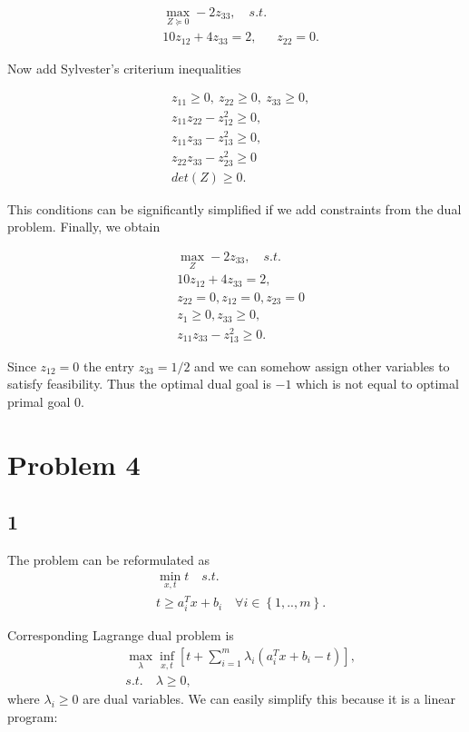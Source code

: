 \documentclass[a4paper,12pt,russian]{extreport}
\begin{document}
\begin{align*}
&\max_{Z \succeq 0} - 2z_{33}, \quad s.t. \\
&10z_{12}+4z_{33}=2,
&z_{22}=0.
\end{align*}

Now add Sylvester's criterium inequalities

\begin{align*}
&z_{11} \geq 0, ~ z_{22}\geq 0, ~ z_33 \geq 0,\\
&z_{11}z_{22}-z_{12}^2 \geq 0,\\
&z_{11}z_{33}-z_{13}^2 \geq 0,\\
&z_{22}z_{33} - z_{23}^2 \geq 0\\
&det(Z) \geq 0.
\end{align*}

This conditions can be significantly simplified if we add constraints from the dual problem. Finally, we obtain

\begin{align*}
&\max_{Z} - 2z_{33}, \quad s.t. \\
&10z_{12}+4z_{33}=2,\\
&z_{22}=0, z_{12}=0, z_{23}=0\\
&z_1 \geq 0, z_{33} \geq 0,\\
&z_{11}z_{33}-z_{13}^2 \geq 0.
\end{align*}

Since $z_{12}=0$ the entry $z_{33}=1/2$ and we can somehow assign other variables to satisfy feasibility. Thus the optimal dual goal is $-1$ which is not equal to optimal primal goal $0$.


\section* {Problem 4}

\subsection*{1}

The problem can be reformulated as
\begin{align*}
&\min_{x,t} t \quad s.t. \\
&t \geq a_{i}^Tx + b_i \quad \forall i \in \left\lbrace 1,..,m \right\rbrace.
\end{align*}

Corresponding Lagrange dual problem is
\begin{align*}
&\max_{\lambda} \inf_{x,t} \left[t+ \sum_{i=1}^{m} \lambda_i(a_{i}^Tx + b_i - t)\right],\\
& s.t. \quad \lambda \geq 0,
\end{align*}
where $\lambda_i \geq 0$ are dual variables. We can easily simplify this because it is a linear program:
\end{document}
